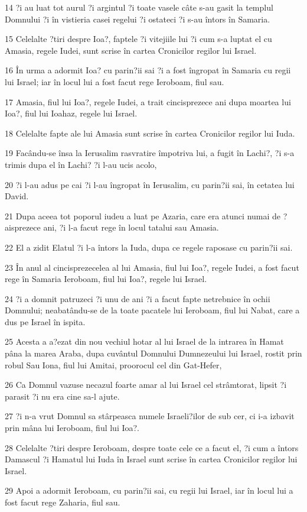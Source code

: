 \par 14 ?i au luat tot aurul ?i argintul ?i toate vasele câte s-au gasit la templul Domnului ?i în vistieria casei regelui ?i ostateci ?i s-au întors în Samaria.
\par 15 Celelalte ?tiri despre Ioa?, faptele ?i vitejiile lui ?i cum s-a luptat el cu Amasia, regele Iudei, sunt scrise în cartea Cronicilor regilor lui Israel.
\par 16 În urma a adormit Ioa? cu parin?ii sai ?i a fost îngropat în Samaria cu regii lui Israel; iar în locul lui a fost facut rege Ieroboam, fiul sau.
\par 17 Amasia, fiul lui Ioa?, regele Iudei, a trait cincisprezece ani dupa moartea lui Ioa?, fiul lui Ioahaz, regele lui Israel.
\par 18 Celelalte fapte ale lui Amasia sunt scrise în cartea Cronicilor regilor lui Iuda.
\par 19 Facându-se însa la Ierusalim rasvratire împotriva lui, a fugit în Lachi?, ?i s-a trimis dupa el în Lachi? ?i l-au ucis acolo,
\par 20 ?i l-au adus pe cai ?i l-au îngropat în Ierusalim, cu parin?ii sai, în cetatea lui David.
\par 21 Dupa aceea tot poporul iudeu a luat pe Azaria, care era atunci numai de ?aisprezece ani, ?i l-a facut rege în locul tatalui sau Amasia.
\par 22 El a zidit Elatul ?i l-a întors la Iuda, dupa ce regele raposase cu parin?ii sai.
\par 23 În anul al cincisprezecelea al lui Amasia, fiul lui Ioa?, regele Iudei, a fost facut rege în Samaria Ieroboam, fiul lui Ioa?, regele lui Israel.
\par 24 ?i a domnit patruzeci ?i unu de ani ?i a facut fapte netrebnice în ochii Domnului; neabatându-se de la toate pacatele lui Ieroboam, fiul lui Nabat, care a dus pe Israel în ispita.
\par 25 Acesta a a?ezat din nou vechiul hotar al lui Israel de la intrarea în Hamat pâna la marea Araba, dupa cuvântul Domnului Dumnezeului lui Israel, rostit prin robul Sau Iona, fiul lui Amitai, proorocul cel din Gat-Hefer,
\par 26 Ca Domnul vazuse necazul foarte amar al lui Israel cel strâmtorat, lipsit ?i parasit ?i nu era cine sa-l ajute.
\par 27 ?i n-a vrut Domnul sa stârpeasca numele Israeli?ilor de sub cer, ci i-a izbavit prin mâna lui Ieroboam, fiul lui Ioa?.
\par 28 Celelalte ?tiri despre Ieroboam, despre toate cele ce a facut el, ?i cum a întors Damascul ?i Hamatul lui Iuda în Israel sunt scrise în cartea Cronicilor regilor lui Israel.
\par 29 Apoi a adormit Ieroboam, cu parin?ii sai, cu regii lui Israel, iar în locul lui a fost facut rege Zaharia, fiul sau.

